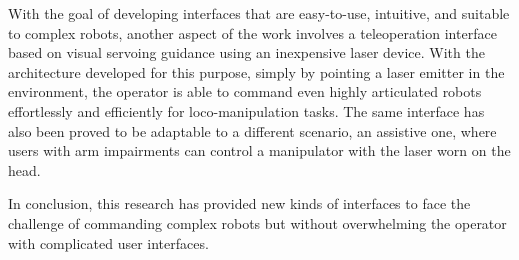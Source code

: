 With the goal of developing interfaces that are easy-to-use, intuitive, and suitable to complex robots, another aspect of the work involves a teleoperation interface based on visual servoing guidance using an inexpensive laser device. With the architecture developed for this purpose, simply by pointing a laser emitter in the environment, the operator is able to command even highly articulated robots effortlessly and efficiently for loco-manipulation tasks. The same interface has also been proved to be adaptable to a different scenario, an assistive one, where users with arm impairments can control a manipulator with the laser worn on the head.    

In conclusion, this research has provided new kinds of interfaces to face the challenge of commanding complex robots but without overwhelming the operator with complicated user interfaces.